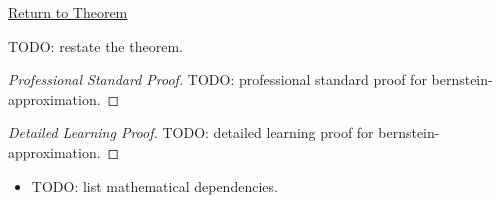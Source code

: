 \newpage
{}
\label{prf:bernstein-approximation}

\begin{remark*}[Return]
\hyperref[thm:bernstein-approximation]{Return to Theorem}
\end{remark*}

\begin{theorem*}
TODO: restate the theorem.
\end{theorem*}

\begin{proof}[Professional Standard Proof]
\LRAProofBodyStart
TODO: professional standard proof for bernstein-approximation.
\end{proof}

\begin{proof}[Detailed Learning Proof]
\LRAProofBodyStart
TODO: detailed learning proof for bernstein-approximation.
\end{proof}

\begin{remark*}
\end{remark*}

\begin{dependencies}
\begin{itemize}
  \item TODO: list mathematical dependencies.
\end{itemize}
\end{dependencies}

\clearpage

